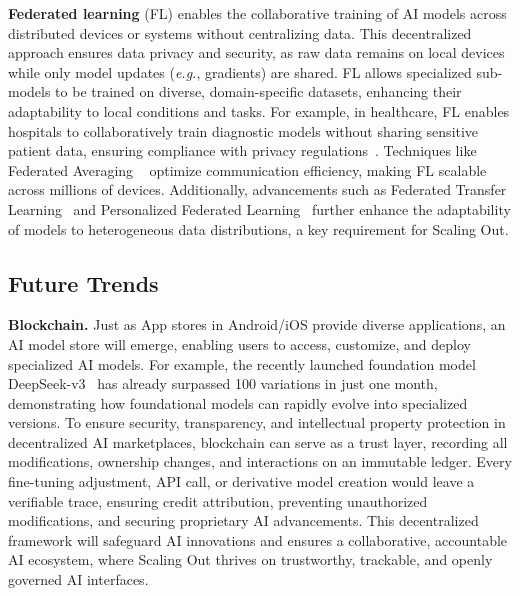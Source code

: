 \textbf{Federated learning} (FL) enables the collaborative training of AI models across distributed devices or systems without centralizing data. This decentralized approach ensures data privacy and security, as raw data remains on local devices while only model updates (\textit{e.g.}, gradients) are shared. FL allows specialized sub-models to be trained on diverse, domain-specific datasets, enhancing their adaptability to local conditions and tasks. For example, in healthcare, FL enables hospitals to collaboratively train diagnostic models without sharing sensitive patient data, ensuring compliance with privacy regulations~\cite{yang2019federated}. Techniques like Federated Averaging ~\cite{mcmahan2017communication} optimize communication efficiency, making FL scalable across millions of devices. Additionally, advancements such as Federated Transfer Learning~\cite{saha2021federated} and Personalized Federated Learning~\cite{smith2017federated} further enhance the adaptability of models to heterogeneous data distributions, a key requirement for Scaling Out. 

\subsection{Future Trends}

\textbf{Blockchain.}
Just as App stores in Android/iOS provide diverse applications, an AI model store will emerge, enabling users to access, customize, and deploy specialized AI models. For example, the recently launched foundation model DeepSeek-v3~\cite{liu2024deepseek3} has already surpassed 100 variations in just one month, demonstrating how foundational models can rapidly evolve into specialized versions. To ensure security, transparency, and intellectual property protection in decentralized AI marketplaces, blockchain can serve as a trust layer, recording all modifications, ownership changes, and interactions on an immutable ledger. Every fine-tuning adjustment, API call, or derivative model creation would leave a verifiable trace, ensuring credit attribution, preventing unauthorized modifications, and securing proprietary AI advancements. This decentralized framework will safeguard AI innovations and ensures a collaborative, accountable AI ecosystem, where Scaling Out thrives on trustworthy, trackable, and openly governed AI interfaces.

